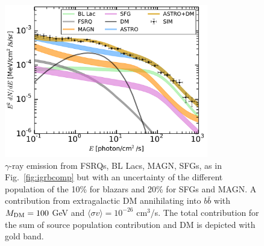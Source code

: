 \documentclass[12 pt]{article}
\begin{document}
\begin{figure} %
 \centering
  \includegraphics[width=3.5in]{money_plot_proposal.pdf} 
\vspace{-0.5cm}
   \caption{$\gamma$-ray emission from FSRQs, BL Lacs, MAGN, SFGs, as in Fig.~\ref{fig:igrbcomp} but with an uncertainty of the different population of the 10\% for blazars and 20\% for SFGs and MAGN. A contribution from extragalactic DM annihilating into $b\bar{b}$ with $M_{\rm{DM}}=100$ GeV and $\langle \sigma v \rangle = 10^{-26}$ cm$^3$/s. The total contribution for the sum of source population contribution and DM is depicted with gold band.}
   \label{fig:moneyplot}
\end{figure}




\vspace{-0.5cm}
\end{document}
